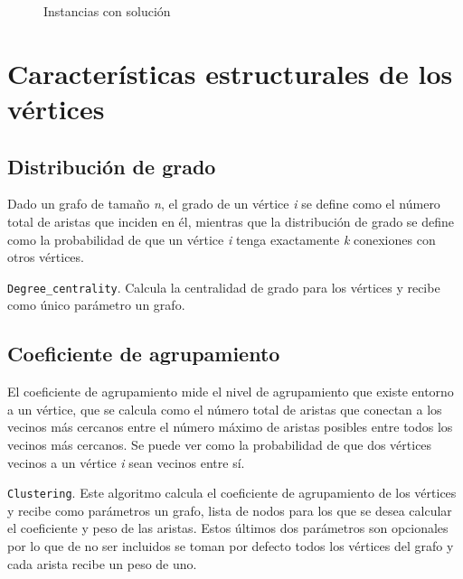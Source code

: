 \documentclass{article}
\begin{document}
\begin{figure}[H]
\centering
{}\hspace{5mm}
\vspace{5mm}
\hspace{5mm}
\vspace{5mm}
\caption{Instancias con solución} \label{Grafos3}
\end{figure}
\section{Características estructurales de los vértices}

\subsection*{Distribución de grado}
Dado un grafo de tamaño \textit{n}, el grado de un vértice \textit{i} se define como el número total de aristas que inciden en él, mientras que la distribución de grado se define como la probabilidad de que un vértice \textit{i} tenga exactamente \textit{k} conexiones con otros vértices.

\texttt{Degree\_centrality}. Calcula la centralidad de grado para los vértices y recibe como único parámetro un grafo.  


\subsection*{Coeficiente de agrupamiento}
El coeficiente de agrupamiento mide el nivel de agrupamiento que existe entorno a un vértice, que se calcula como el número total de aristas que conectan a los vecinos más cercanos entre el número máximo de aristas posibles entre todos los vecinos más cercanos. Se puede ver como la probabilidad de que dos vértices vecinos a un vértice \textit{i} sean vecinos entre sí. 

\texttt{Clustering}. Este algoritmo calcula el coeficiente de agrupamiento de los vértices y recibe como parámetros un grafo, lista de nodos para los que se desea calcular el coeficiente y peso de las aristas. Estos últimos dos parámetros son opcionales por lo que de no ser incluidos se toman por defecto todos los vértices del grafo y cada arista recibe un peso de uno. 

\end{document}
